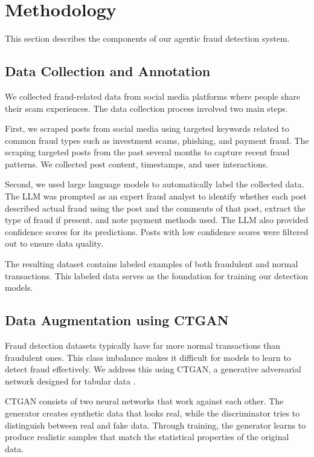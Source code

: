\section{Methodology}\label{sec:methodology}

This section describes the components of our agentic fraud detection system.

\subsection{Data Collection and Annotation}

We collected fraud-related data from social media platforms where people share their scam experiences. The data collection process involved two main steps.

First, we scraped posts from social media using targeted keywords related to common fraud types such as investment scams, phishing, and payment fraud. The scraping targeted posts from the past several months to capture recent fraud patterns. We collected post content, timestamps, and user interactions.

Second, we used large language models to automatically label the collected data. The LLM was prompted as an expert fraud analyst to identify whether each post described actual fraud using the post and the comments of that post, extract the type of fraud if present, and note payment methods used. The LLM also provided confidence scores for its predictions. Posts with low confidence scores were filtered out to ensure data quality.

The resulting dataset contains labeled examples of both fraudulent and normal transactions. This labeled data serves as the foundation for training our detection models.

\subsection{Data Augmentation using CTGAN}

Fraud detection datasets typically have far more normal transactions than fraudulent ones. This class imbalance makes it difficult for models to learn to detect fraud effectively. We address this using CTGAN, a generative adversarial network designed for tabular data \cite{xu2019ctgan}.

CTGAN consists of two neural networks that work against each other. The generator creates synthetic data that looks real, while the discriminator tries to distinguish between real and fake data. Through training, the generator learns to produce realistic samples that match the statistical properties of the original data.

